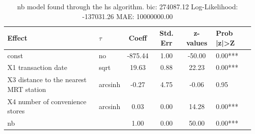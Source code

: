 \begin{table}
	\caption{nb model found through the hs algorithm. bic: 274087.12 Log-Likelihood: -137031.26 MAE: 10000000.00}
	\begin{center}
		\begin{tabular}{|l|l|c|c|c|l|}
			\hline
			Effect & $\tau$ & Coeff & Std. Err & z-values & Prob |z|>Z \\
			\hline
			const & no & -875.44 & 1.00 & -50.00 & 0.00*** \\
			\hline
			X1 transaction date & sqrt & 19.63 & 0.88 & 22.23 & 0.00*** \\
			\hline
			X3 distance to the nearest MRT station & arcsinh & -0.27 & 4.75 & -0.06 & 0.95 \\
			\hline
			X4 number of convenience stores & arcsinh & 0.03 & 0.00 & 14.28 & 0.00*** \\
			\hline
			nb &  & 1.00 & 0.00 & 50.00 & 0.00*** \\
			\hline
		\end{tabular}
	\end{center}
\end{table}